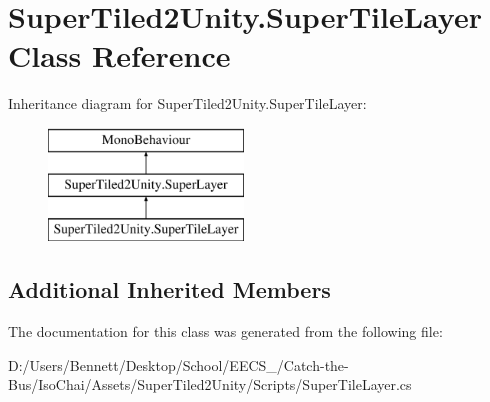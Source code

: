\hypertarget{class_super_tiled2_unity_1_1_super_tile_layer}{}\section{Super\+Tiled2\+Unity.\+Super\+Tile\+Layer Class Reference}
\label{class_super_tiled2_unity_1_1_super_tile_layer}
Inheritance diagram for Super\+Tiled2\+Unity.\+Super\+Tile\+Layer\+:\begin{figure}[H]
\begin{center}
\leavevmode
\includegraphics[height=3.000000cm]{class_super_tiled2_unity_1_1_super_tile_layer}
\end{center}
\end{figure}
\subsection*{Additional Inherited Members}


The documentation for this class was generated from the following file\+:\begin{DoxyCompactItemize}
\item 
D\+:/\+Users/\+Bennett/\+Desktop/\+School/\+E\+E\+C\+S\+\_/\+Catch-\/the-\/\+Bus/\+Iso\+Chai/\+Assets/\+Super\+Tiled2\+Unity/\+Scripts/Super\+Tile\+Layer.\+cs\end{DoxyCompactItemize}
